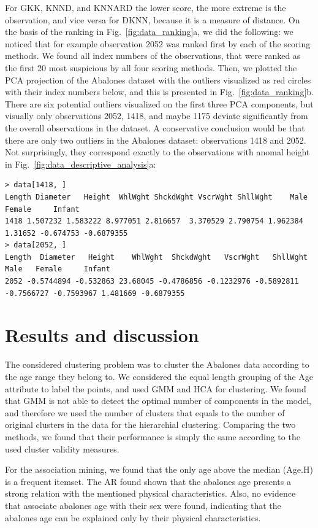 \documentclass[10pt, paper=a4]{article}
\begin{document}
For GKK, KNND, and KNNARD the lower score, the more extreme is the observation,
and vice versa for DKNN, because it is a measure of distance.  On the basis of
the ranking in Fig.~\ref{fig:data_ranking}a, we did the following: we noticed
that for example observation 2052 was ranked first by each of the scoring
methods.  We found all index numbers of the observations, that were ranked as
the first 20 most suspicious by all four scoring methods.  Then, we plotted the
PCA projection of the Abalones dataset with the outliers visualized as red
circles with their index numbers below, and this is presented in
Fig.~\ref{fig:data_ranking}b.  There are six potential outliers visualized on
the first three PCA components, but visually only observations 2052, 1418, and
maybe 1175 deviate significantly from the overall observations in the dataset.
A conservative conclusion would be that there are only two outliers in the
Abalones dataset: observations 1418 and 2052.  Not surprisingly, they correspond
exactly to the observations with anomal height in
Fig.~\ref{fig:data_descriptive_analysis}a:
\begin{verbatim}
> data[1418, ]
Length Diameter   Height  WhlWght ShckdWght VscrWght ShllWght    Male    Female     Infant
1418 1.507232 1.583222 8.977051 2.816657  3.370529 2.790754 1.962384 1.31652 -0.674753 -0.6879355
> data[2052, ]
Length  Diameter   Height    WhlWght  ShckdWght   VscrWght   ShllWght       Male   Female     Infant
2052 -0.5744894 -0.532863 23.68045 -0.4786856 -0.1232976 -0.5892811 -0.7566727 -0.7593967 1.481669 -0.6879355
\end{verbatim}

\section{Results and discussion}
\label{sec:results_and_discussion}
The considered clustering problem was to cluster the Abalones data according to
the age range they belong to.  We considered the equal length grouping of the
Age attribute to label the points, and used GMM and HCA for clustering.  We
found that GMM is not able to detect the optimal number of components in the
model, and therefore we used the number of clusters that equals to the number of
original clusters in the data for the hierarchial clustering.  Comparing the two
methods, we found that their performance is simply the same according to the
used cluster validity measures.

For the association mining, we found that the only age above the median (Age.H) is a frequent itemset. The AR found shown that the abalones age presents a strong relation with the mentioned physical characteristics. Also, no evidence that associate abalones age with their sex were found, indicating that the abalones age can be explained only by their physical characteristics.
\end{document}
